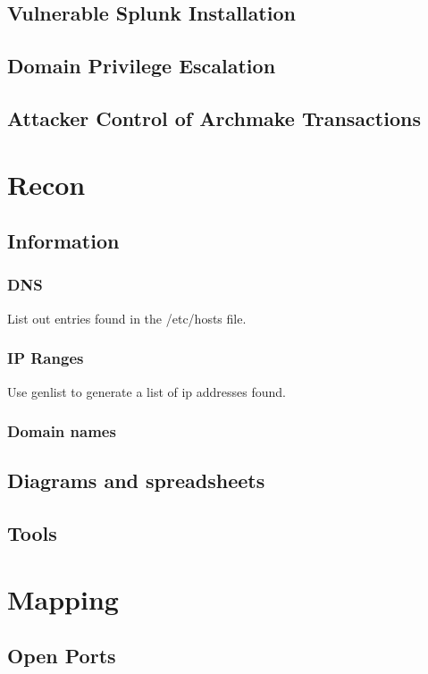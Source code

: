 \documentclass{article}
\begin{document}
\subsection{Vulnerable Splunk Installation}
\subsection{Domain Privilege Escalation}
\subsection{Attacker Control of Archmake Transactions}

\newpage
\section{Recon}
\subsection{Information}
\subsubsection{DNS}

List out entries found in the /etc/hosts file.

\subsubsection{IP Ranges}

Use genlist to generate a list of ip addresses found.

\subsubsection{Domain names}


\subsection{Diagrams and spreadsheets}
\subsection{Tools}

\newpage
\section{Mapping}
\subsection{Open Ports}
\end{document}
